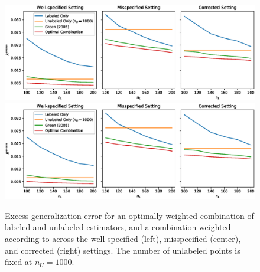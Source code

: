 
\begin{figure}
    \centering
    \ifsinglecolumn
    \includegraphics[width=.75\textwidth]{eps_figures/combined.eps}
    \else
    \includegraphics[width=.48\textwidth]{eps_figures/combined.eps}
    \fi
    \caption{Excess generalization error for an optimally weighted combination of labeled and unlabeled estimators, and a combination weighted according to \cite{GreenStrawderman2001} across the well-specified (left), misspecified (center), and corrected (right) settings. The number of unlabeled points is fixed at $n_U=1000$. %
    }
    \label{fig:combined}
\end{figure}